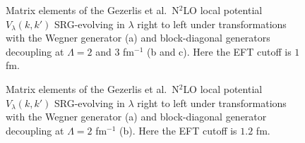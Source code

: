 \documentclass[preprintnumbers,floatfix,aps,prc,preprint,nofootinbib]{revtex4-1}
\begin{document}
\begin{figure}[H]
	\centering
	

	\caption{Matrix elements of the Gezerlis et al.~N$^2$LO local potential $V_{\lambda}(k, k')$ SRG-evolving in $\lambda$ right to left under transformations with the Wegner generator (a) and block-diagonal generators decoupling at $\Lambda=2$ and $3$ fm$^{-1}$ (b and c). Here the EFT cutoff is $1$ fm.}
	\label{potential_contours_kvnn222_3S1}
\end{figure}

\begin{figure}[H]
	\centering
	
	\caption{Matrix elements of the Gezerlis et al.~N$^2$LO local potential $V_{\lambda}(k, k')$ SRG-evolving in $\lambda$ right to left under transformations with the Wegner generator (a) and block-diagonal generator decoupling at $\Lambda=2$ fm$^{-1}$ (b). Here the EFT cutoff is $1.2$ fm.}
	\label{potential_contours_kvnn224_3S1}
\end{figure}
\end{document}
